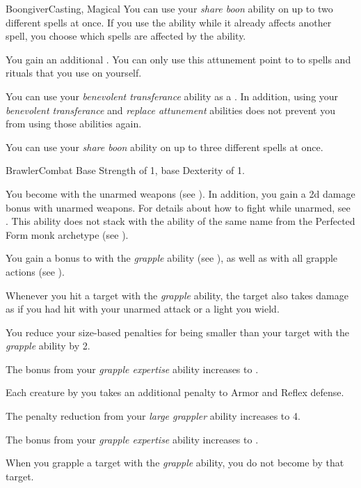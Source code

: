 \begin{feat}{Boongiver}{Casting, Magical}
         You can use your \textit{share boon} ability on up to two different spells at once.
        If you use the ability while it already affects another spell, you choose which spells are affected by the ability.

         You gain an additional .
        You can only use this attunement point to  to spells and rituals that you use on yourself.

         You can use your \textit{benevolent transferance} ability as a .
        In addition, using your \textit{benevolent transferance} and \textit{replace attunement} abilities does not prevent you from using those abilities again.

         You can use your \textit{share boon} ability on up to three different spells at once.
    \end{feat}

    \begin{feat}{Brawler}{Combat}
        \featpre Base Strength of 1, base Dexterity of 1.

         You become  with the unarmed weapons  (see ).
        In addition, you gain a \plus2d damage bonus with unarmed weapons.
        For details about how to fight while unarmed, see .
        This ability does not stack with the ability of the same name from the Perfected Form monk archetype (see ).

         You gain a  bonus to  with the \textit{grapple} ability (see ), as well as with all grapple actions (see ).

         Whenever you hit a target with the \textit{grapple} ability, the target also takes damage as if you had hit with your unarmed attack or a light  you wield.

         You reduce your size-based penalties for being smaller than your target with the \textit{grapple} ability by 2.

         The bonus from your \textit{grapple expertise} ability increases to .

         Each creature \grappled by you takes an additional  penalty to Armor and Reflex defense.

         The penalty reduction from your \textit{large grappler} ability increases to 4.

         The bonus from your \textit{grapple expertise} ability increases to .

         When you grapple a target with the \textit{grapple} ability, you do not become \grappled by that target.
    \end{feat}

